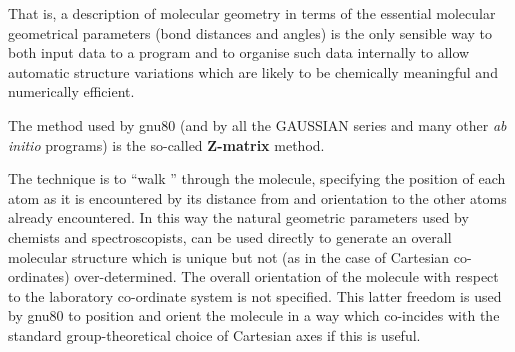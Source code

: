 That is, a description of molecular geometry in terms of the
essential molecular geometrical parameters (bond distances and angles)
is the only sensible way to both input data to a program and to
organise such data internally to allow automatic structure variations
which are likely to be chemically meaningful and numerically
efficient.

The method used by gnu80 (and by all the GAUSSIAN series and
many other {\em ab initio} programs) is the so-called
{\bf Z-matrix} method.

The technique is to ``walk '' through the molecule,
specifying the position of each atom as it is encountered by
its distance from and orientation to the other atoms already
encountered. In this way the natural geometric parameters used by
chemists and spectroscopists, can be used directly to generate 
an overall molecular structure which is unique but not (as in
the case of Cartesian co-ordinates) over-determined. The
overall orientation of the molecule with respect to the
laboratory co-ordinate system is not specified. This latter
freedom is used by gnu80 to position and orient the molecule
in a way which co-incides with the standard group-theoretical
choice of Cartesian axes if this is useful.

